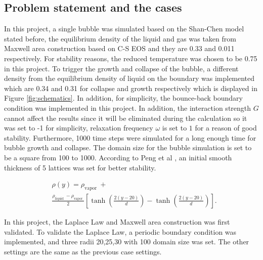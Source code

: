 \documentclass[review]{elsarticle}
\begin{document}
\subsection{Problem statement and the cases}
In this project, a single bubble was simulated based on the Shan-Chen model stated before, the equilibrium density of the liquid and gas was taken from Maxwell area construction based on C-S EOS and they are 0.33 and 0.011 respectively. For stability reasons, the reduced temperature was chosen to be 0.75 in this project. To trigger the growth and collapse of the bubble, a different density from the equilibrium density of liquid on the boundary was implemented which are 0.34 and 0.31 for collapse and growth respectively which is displayed in Figure \ref{fig:schematics}. In addition, for simplicity, the bounce-back boundary condition was implemented in this project. In addition, the interaction strength $G$ cannot affect the results since it will be eliminated during the calculation \cite{shi2020numerical} so it was set to -1 for simplicity, relaxation frequency $\omega$ is set to $1$ for a reason of good stability. Furthermore, 1000 time steps were simulated for a long enough time for bubble growth and collapse. The domain size for the bubble simulation is set to be a square from 100 to 1000. According to Peng et al \cite{peng2019simulation}, an initial smooth thickness of 5 lattices was set for better stability.
\begin{linenomath*}
\begin{equation}
	\begin{aligned}
		&\rho(y)=\rho_{\text {vapor }}+\\
		&\frac{\rho_{\text {liquid }}-\rho_{\text {vapor }}}{2}\left[\tanh \left(\frac{2(y-20)}{d}\right)-\tanh \left(\frac{2(y-20)}{d}\right)\right].
	\end{aligned}
\end{equation}
\end{linenomath*}

In this project, the Laplace Law and Maxwell area construction was first validated. To validate the Laplace Law, a periodic boundary condition was implemented, and three radii 20,25,30 with 100 domain size was set. The other settings are the same as the previous case settings. 
\end{document}
